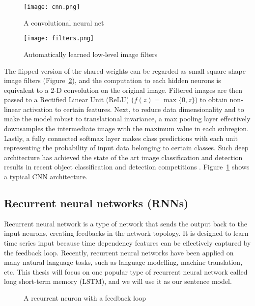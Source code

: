 \begin{figure}
\texttt{[image: cnn.png]}
\caption{A convolutional neural net \cite{cnn}}
\label{fig:cnn}
\end{figure}

\begin{figure}
\texttt{[image: filters.png]}
\caption{Automatically learned low-level image filters \cite{krizhevsky12}}
\label{fig:cnn_filters}
\end{figure}

The flipped version of the shared weights can be regarded as small square shape image filters (Figure~\ref{fig:cnn_filters}), and the computation to each hidden neurons is equivalent to a 2-D convolution on the original image. Filtered images are then passed to a Rectified Linear Unit (ReLU) ($f(z) = \max\{0, z\}$) to obtain non­linear activation to certain features. Next, to reduce data dimensionality and to make the model robust to translational invariance, a max pooling layer effectively downsamples the intermediate image with the maximum value in each subregion. Lastly, a fully connected softmax layer makes class predictions with each unit representing the probability of input data belonging to certain classes. Such deep architecture has achieved the state of the art image classification and detection results in recent object classification and detection competitions \cite{krizhevsky12, girshick14}. Figure~\ref{fig:cnn} shows a typical CNN architecture. 

\subsection{Recurrent neural networks (RNNs)}

Recurrent neural network is a type of network that sends the output back to the input neurons, creating feedbacks in the network topology. It is designed to learn time series input because time dependency features can be effectively captured by the feedback loop. Recently, recurrent neural networks have been applied on many natural language tasks, such as language modelling, machine translation, etc. This thesis will focus on one popular type of recurrent neural network called long short-term memory (LSTM), and we will use it as our sentence model.

\begin{figure}
\centering

\caption{A recurrent neuron with a feedback loop}
\label{fig:rnn}
\end{figure}

